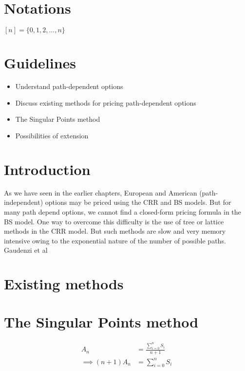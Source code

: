 \section{Notations}
$[n] = \{0, 1, 2, \dots, n\}$


\section{Guidelines}
\label{sec:guidelines}
\begin{itemize}
\item Understand path-dependent options
\item Discuss existing methods for pricing path-dependent options
\item The Singular Points method
\item Possibilities of extension
\end{itemize}



\section{Introduction}
\label{sec:intro}
As we have seen in the earlier chapters, European and American (path-independent) options may be priced using the CRR and BS models. But for many path depend options, we cannot find a closed-form pricing formula in the BS model. One way to overcome this difficulty is the use of tree or lattice methods in the CRR model. But such methods are slow and very memory intensive owing to the exponential nature of the number of possible paths. Gaudenzi et al%


\section{Existing methods}
\label{sec:existing-methods}


\section{The Singular Points method}
\label{sec:sing-points-meth}





\begin{align} \label{eq:am}
  A_{n} &= \frac{\sum_{i=0}^n S_i}{n+1} \\
  \implies (n+1) A_{n} &= \sum_{i=0}^n S_i
\end{align}


